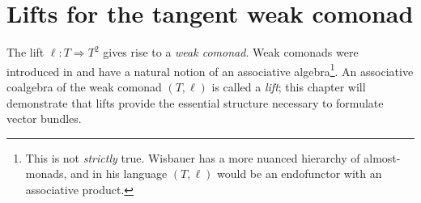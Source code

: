 \section{Lifts for the tangent weak comonad}%
\label{sec:lifts}
The lift $\ell: T \Rightarrow T^2$ gives rise to a \emph{weak comonad}.
%   
Weak comonads were introduced in \cite{Wisbauer2013} and have a natural notion of an associative algebra\footnote{
This is not \emph{strictly} true. Wisbauer has a more nuanced hierarchy of almost-monads, and in his language $(T,\ell)$ would be an endofunctor with an associative product.
}. An associative coalgebra of the weak comonad $(T,\ell)$ is called a \emph{lift}; this chapter will demonstrate that lifts provide the essential structure necessary to formulate vector bundles.
